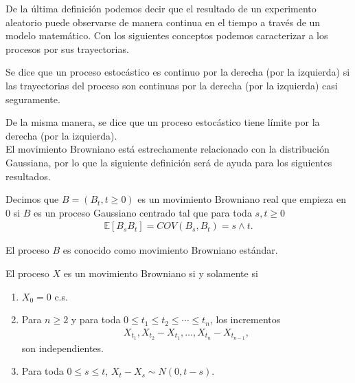 De la última definición podemos decir que el resultado de un experimento aleatorio puede observarse de manera continua en el tiempo a través de un modelo matemático. Con los siguientes conceptos podemos caracterizar a los procesos por sus trayectorias.

\begin{definition}
Se dice que un proceso estocástico es continuo por la derecha (por la izquierda) si las trayectorias del proceso son continuas por la derecha (por la izquierda) casi seguramente.
\end{definition}

De la misma manera, se dice que un proceso estocástico tiene límite por la derecha (por la izquierda). \\

El movimiento Browniano está estrechamente relacionado con la distribución Gaussiana, por lo que la siguiente definición será de ayuda para los siguientes resultados.

\begin{definition}
Decimos que $B = (B_t, t \geq 0)$ es un movimiento Browniano real que empieza en 0 si $B$ es un proceso Gaussiano centrado tal que para toda $s, t \geq 0$
\begin{align}
\mathbb{E}[B_s B_t] = COV(B_s, B_t) = s \wedge t.
\end{align}

El proceso $B$ es conocido como movimiento Browniano estándar.
\end{definition}

\begin{proposition}
El proceso $X$ es un movimiento Browniano si y solamente si
\begin{enumerate}
\item $X_0 = 0$ c.s.
\item Para $n \geq 2$ y para toda $0 \leq t_1 \leq t_2 \leq \cdots \leq t_n$, los incrementos
  \begin{align*}
  	X_{t_1}, X_{t_2} - X_{t_1}, \ldots, X_{t_n} - X_{t_{n-1}},
  \end{align*}
son independientes.
\item Para toda $0 \leq s \leq t$, $X_t - X_s \sim N(0, t - s)$.
\end{enumerate}
\end{proposition}

